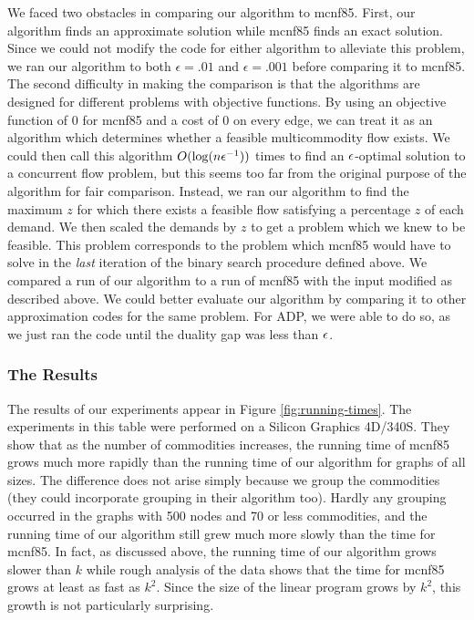 We faced two obstacles in comparing our algorithm to {\sc mcnf85}.  
First, our algorithm finds an approximate solution while {\sc mcnf85}
finds an exact solution.
Since we could not modify the code for either algorithm to alleviate
this problem,
we ran our algorithm to both $\epsilon = .01$ and $\epsilon = .001$
before comparing it to {\sc mcnf85}.
The second difficulty in making the comparison is that
the algorithms are designed for different problems with objective functions.  
By using an objective function of
$0$ for {\sc mcnf85} and a cost of $0$ on every edge,
we can treat it as an algorithm which determines whether a feasible
multicommodity flow exists.  
We could then call this algorithm $O(\log(n\epsilon^{-1}))$ times 
to find an $\epsilon$-optimal solution to a concurrent flow problem, 
but this seems too far from the original purpose of the algorithm 
for fair comparison.  
Instead, we ran our algorithm to find the maximum $z$ for which there
exists a feasible flow satisfying a percentage $z$ of each demand.  
We then scaled the demands by $z$ to get a
problem which we knew to be feasible.  
This problem corresponds to 
the problem which {\sc mcnf85} would have to solve in the {\em last}
iteration of the binary search procedure defined above.  
We compared a run of our algorithm to a run of {\sc mcnf85} with the input
modified as described above.
We could better evaluate our algorithm by comparing it to other
approximation codes for the same problem.
For ADP, we were able to do so, as we just ran the code until the
duality gap was less than $\epsilon$.  

\subsubsection{The Results}

The results of our experiments appear in Figure
\ref{fig:running-times}.
The experiments in this table were performed on a Silicon Graphics 4D/340S.
They show that as the number of commodities increases, the
running time of {\sc mcnf85} grows much more rapidly than the running time of 
our algorithm for graphs of all sizes.  
The difference does not arise simply because we group the commodities
(they could incorporate grouping in their algorithm too).
Hardly any grouping occurred in the graphs with 500 nodes and 70 or
less commodities, 
and the running time of our algorithm still grew much more slowly than
the time for {\sc mcnf85}.
In fact, as discussed above, the running time of our algorithm grows 
slower than $k$ while rough analysis of the data shows that the time for
{\sc mcnf85} grows at least as fast as $k^2$.
Since the size of the linear program grows by $k^2$, 
this growth is not particularly surprising.

